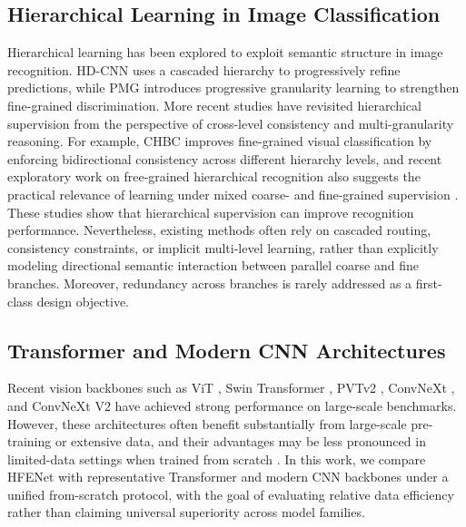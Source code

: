 \documentclass[pdflatex,sn-mathphys-num]{sn-jnl}
\theoremstyle{thmstyleone}%
\theoremstyle{thmstyletwo}%
\theoremstyle{thmstylethree}%
\begin{document}
\subsection{Hierarchical Learning in Image Classification}
Hierarchical learning has been explored to exploit semantic structure in image recognition. 
HD-CNN \cite{yan2015hdcnn} uses a cascaded hierarchy to progressively refine predictions, while PMG \cite{du2020fine} introduces progressive granularity learning to strengthen fine-grained discrimination. 
More recent studies have revisited hierarchical supervision from the perspective of cross-level consistency and multi-granularity reasoning. 
For example, CHBC \cite{gao2025chbc} improves fine-grained visual classification by enforcing bidirectional consistency across different hierarchy levels, and recent exploratory work on free-grained hierarchical recognition also suggests the practical relevance of learning under mixed coarse- and fine-grained supervision \cite{park2025freegrained}. 
These studies show that hierarchical supervision can improve recognition performance. 
Nevertheless, existing methods often rely on cascaded routing, consistency constraints, or implicit multi-level learning, rather than explicitly modeling directional semantic interaction between parallel coarse and fine branches. 
Moreover, redundancy across branches is rarely addressed as a first-class design objective.

\subsection{Transformer and Modern CNN Architectures}
Recent vision backbones such as ViT \cite{dosovitskiy2020image}, Swin Transformer \cite{liu2021swin}, PVTv2 \cite{wang2022pvt}, ConvNeXt \cite{liu2022convnext}, and ConvNeXt V2 \cite{woo2023convnextv2} have achieved strong performance on large-scale benchmarks. 
However, these architectures often benefit substantially from large-scale pre-training or extensive data, and their advantages may be less pronounced in limited-data settings when trained from scratch \cite{touvron2021training}.
In this work, we compare HFENet with representative Transformer and modern CNN backbones under a unified from-scratch protocol, with the goal of evaluating relative data efficiency rather than claiming universal superiority across model families.
\end{document}
